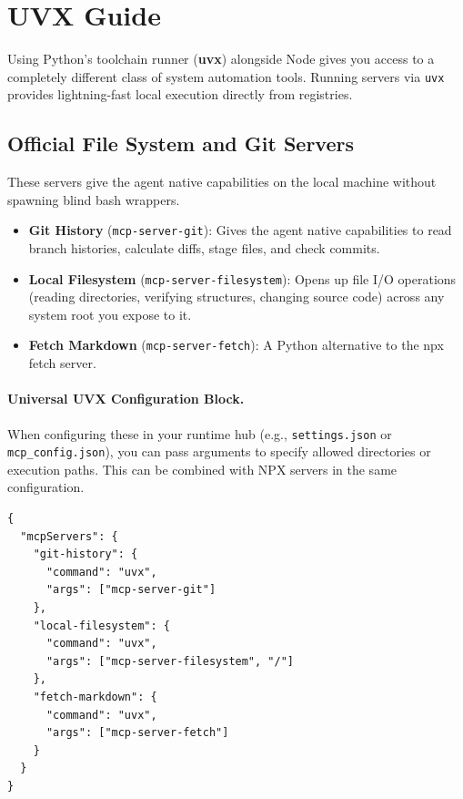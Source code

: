 \newpage
\section{UVX Guide}

Using Python's toolchain runner (\textbf{uvx}) alongside Node gives you access to a completely different class of system automation tools. Running servers via \lstinline[style=inline]|uvx| provides lightning-fast local execution directly from registries.

\subsection{Official File System and Git Servers}
These servers give the agent native capabilities on the local machine without spawning blind bash wrappers.

\begin{itemize}
    \item \textbf{Git History} (\lstinline[style=inline]|mcp-server-git|): Gives the agent native capabilities to read branch histories, calculate diffs, stage files, and check commits.
    \item \textbf{Local Filesystem} (\lstinline[style=inline]|mcp-server-filesystem|): Opens up file I/O operations (reading directories, verifying structures, changing source code) across any system root you expose to it.
    \item \textbf{Fetch Markdown} (\lstinline[style=inline]|mcp-server-fetch|): A Python alternative to the npx fetch server.
\end{itemize}

\paragraph{Universal UVX Configuration Block.}
When configuring these in your runtime hub (e.g., \lstinline[style=inline]|settings.json| or \lstinline[style=inline]|mcp_config.json|), you can pass arguments to specify allowed directories or execution paths. This can be combined with NPX servers in the same configuration.

\begin{lstlisting}[style=json]
{
  "mcpServers": {
    "git-history": {
      "command": "uvx",
      "args": ["mcp-server-git"]
    },
    "local-filesystem": {
      "command": "uvx",
      "args": ["mcp-server-filesystem", "/"]
    },
    "fetch-markdown": {
      "command": "uvx",
      "args": ["mcp-server-fetch"]
    }
  }
}
\end{lstlisting}
